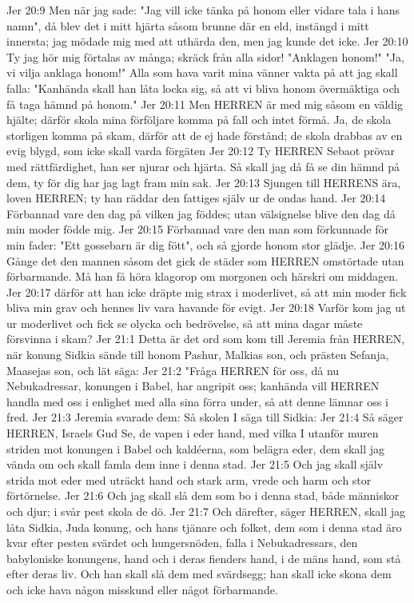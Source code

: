 Jer 20:9  Men när jag sade: "Jag vill icke tänka på honom eller vidare tala i hans namn", då blev det i mitt hjärta såsom brunne där en eld, instängd i mitt innersta; jag mödade mig med att uthärda den, men jag kunde det icke.
Jer 20:10  Ty jag hör mig förtalas av många; skräck från alla sidor! "Anklagen honom!" "Ja, vi vilja anklaga honom!" Alla som hava varit mina vänner vakta på att jag skall falla: "Kanhända skall han låta locka sig, så att vi bliva honom övermäktiga och få taga hämnd på honom."
Jer 20:11  Men HERREN är med mig såsom en väldig hjälte; därför skola mina förföljare komma på fall och intet förmå. Ja, de skola storligen komma på skam, därför att de ej hade förstånd; de skola drabbas av en evig blygd, som icke skall varda förgäten
Jer 20:12  Ty HERREN Sebaot prövar med rättfärdighet, han ser njurar och hjärta. Så skall jag då få se din hämnd på dem, ty för dig har jag lagt fram min sak.
Jer 20:13  Sjungen till HERRENS ära, loven HERREN; ty han räddar den fattiges själv ur de ondas hand.
Jer 20:14  Förbannad vare den dag på vilken jag föddes; utan välsignelse blive den dag då min moder födde mig.
Jer 20:15  Förbannad vare den man som förkunnade för min fader: "Ett gossebarn är dig fött", och så gjorde honom stor glädje.
Jer 20:16  Gånge det den mannen såsom det gick de städer som HERREN omstörtade utan förbarmande. Må han få höra klagorop om morgonen och härskri om middagen.
Jer 20:17  därför att han icke dräpte mig strax i moderlivet, så att min moder fick bliva min grav och hennes liv vara havande för evigt.
Jer 20:18  Varför kom jag ut ur moderlivet och fick se olycka och bedrövelse, så att mina dagar måste försvinna i skam?
Jer 21:1  Detta är det ord som kom till Jeremia från HERREN, när konung Sidkia sände till honom Pashur, Malkias son, och prästen Sefanja, Maasejas son, och lät säga:
Jer 21:2  "Fråga HERREN för oss, då nu Nebukadressar, konungen i Babel, har angripit oss; kanhända vill HERREN handla med oss i enlighet med alla sina förra under, så att denne lämnar oss i fred.
Jer 21:3  Jeremia svarade dem: Så skolen I säga till Sidkia:
Jer 21:4  Så säger HERREN, Israels Gud Se, de vapen i eder hand, med vilka I utanför muren striden mot konungen i Babel och kaldéerna, som belägra eder, dem skall jag vända om och skall famla dem inne i denna stad.
Jer 21:5  Och jag skall själv strida mot eder med uträckt hand och stark arm, vrede och harm och stor förtörnelse.
Jer 21:6  Och jag skall slå dem som bo i denna stad, både människor och djur; i svår pest skola de dö.
Jer 21:7  Och därefter, säger HERREN, skall jag låta Sidkia, Juda konung, och hans tjänare och folket, dem som i denna stad äro kvar efter pesten svärdet och hungersnöden, falla i Nebukadressars, den babyloniske konungens, hand och i deras fienders hand, i de mäns hand, som stå efter deras liv. Och han skall slå dem med svärdsegg; han skall icke skona dem och icke hava någon misskund eller något förbarmande.
